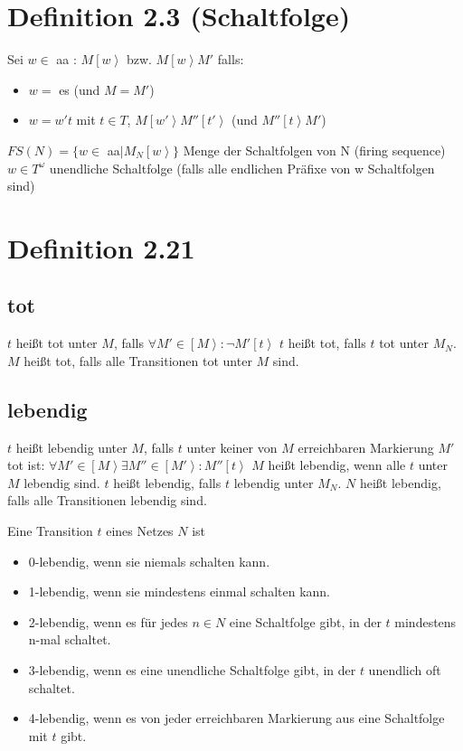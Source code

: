 \documentclass[12pt]{scrreprt}
\begin{document}
\section{Definition 2.3 (Schaltfolge)}
Sei $w \in$ \ac{aa} : $M\left[w\right>$ bzw. $M\left[w\right>M'$ falls:
\begin{itemize}
	\item $w =$ \ac{es} (und $M=M'$)
	\item $w = w't$ mit $t \in T$, $M\left[w'\right>M''\left[t'\right>$ (und $M''\left[t\right>M'$)
\end{itemize}
$FS(N)=\{w \in$ \ac{aa}$ \mid M_N \left[w\right>\}$ Menge der Schaltfolgen von N (firing sequence)\newline
$w \in T^\omega$ unendliche Schaltfolge (falls alle endlichen Präfixe von w Schaltfolgen sind)

\section{Definition 2.21}
\subsection{tot}
$t$ heißt tot unter $M$, falls $\forall M' \in \left[M\right> : \neg M'\left[t\right>$\newline
$t$ heißt tot, falls $t$ tot unter $M_N$.\newline
$M$ heißt tot, falls alle Transitionen tot unter $M$ sind.
\newpage
\subsection{lebendig}
$t$ heißt lebendig unter $M$, falls $t$ unter keiner von $M$ erreichbaren Markierung $M'$ tot ist:\newline
$\forall M' \in \left[M\right>\exists M'' \in \left[M'\right> :  M'' \left[t\right>$\newline
$M$ heißt lebendig, wenn alle $t$ unter $M$ lebendig sind.\newline
$t$ heißt lebendig, falls $t$ lebendig unter $M_N$.\newline
$N$ heißt lebendig, falls alle Transitionen lebendig sind.

Eine Transition $t$ eines Netzes $N$ ist
\begin{itemize}
	\item 0-lebendig, wenn sie niemals schalten kann.
	\item 1-lebendig, wenn sie mindestens einmal schalten kann.
	\item 2-lebendig, wenn es für jedes $n \in N$ eine Schaltfolge gibt, in der $t$ mindestens n-mal schaltet.
	\item 3-lebendig, wenn es eine unendliche Schaltfolge gibt, in der $t$ unendlich oft schaltet.
	\item 4-lebendig, wenn es von jeder erreichbaren Markierung aus eine Schaltfolge mit $t$ gibt.
\end{itemize}
\end{document}
